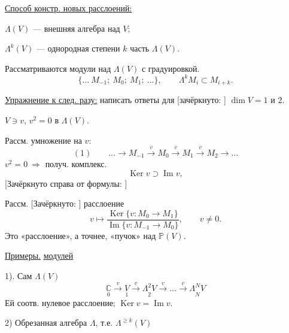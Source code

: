 \underline{Способ констр. новых расслоений:}

$\Lambda(V)$ — внешняя алгебра над $V$;

$\Lambda^k(V)$ — однородная степени $k$ часть $\Lambda(V)$.

Рассматриваются модули над $\Lambda(V)$ с градуировкой.
\begin{equation*}
\{\ldots\ M_{-1};\ M_0;\ M_1;\ \ldots\},
\qquad \Lambda^kM_i\subset M_{i+k}.
\end{equation*}

\underline{Упражнение к след. разу:} написать ответы для
[зачёркнуто:
]
$\dim V=1$ и $2$.


$V\ni v$, $v^2=0$ в $\Lambda(V)$.

Рассм. умножение на $v$:
\begin{equation*}
(1)\qquad
\ldots\to M_{-1}\overset{v}{\longrightarrow}M_0
\overset{v}{\longrightarrow}M_1\overset{v}{\longrightarrow}M_2\to\ldots
\end{equation*}
$v^2=0\ \Rightarrow$ получ. комплекс.
\begin{equation*}
\operatorname{Ker}v\supset\operatorname{Im}v,
\end{equation*}
[Зачёркнуто справа от формулы:
]

Рассм. [Зачёркнуто:
]
расслоение
\begin{equation*}
v\longmapsto
\frac{\operatorname{Ker}\{v:M_0\to M_1\}}
{\operatorname{Im}\{v:M_{-1}\to M_0\}},\qquad v\ne0.
\end{equation*}
Это «расслоение», а точнее, «пучок» над $\mathbb P(V)$.

\underline{Примеры.}\newline
\underline{модулей}

1). Сам $\Lambda(V)$
\begin{equation*}
\underset{0}{\mathbb C}\overset{v}{\longrightarrow}
\underset{1}{V}\overset{v}{\longrightarrow}
\underset{2}{\Lambda^2V}\overset{v}{\longrightarrow}
\ldots\overset{v}{\longrightarrow}\underset{N}{\Lambda^NV}
\end{equation*}
Ей соотв. нулевое расслоение; $\operatorname{Ker}v=\operatorname{Im}v$.

2) Обрезанная алгебра $\Lambda$, т.е. $\Lambda^{\ge k}(V)$

